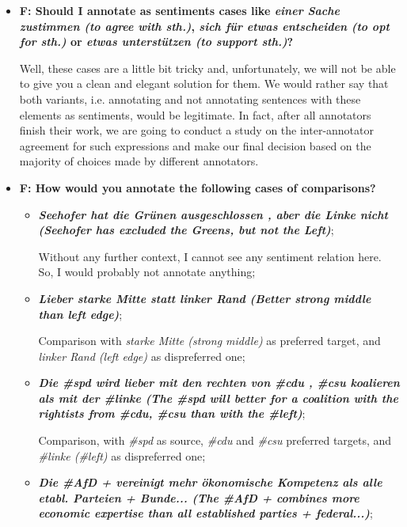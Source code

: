 \documentclass[11pt,a4paper]{article}
\begin{document}
\begin{itemize}
\item\textbf{F: Should I annotate as sentiments cases like \textit{einer Sache
    zustimmen (to agree with sth.)}, \textit{sich f\"ur etwas entscheiden (to
    opt for sth.)} or \textit{etwas unterst\"utzen (to support sth.)}?}

  Well, these cases are a little bit tricky and, unfortunately, we will not be
  able to give you a clean and elegant solution for them.  We would rather say
  that both variants, i.e. annotating and not annotating sentences with these
  elements as sentiments, would be legitimate.  In fact, after all annotators
  finish their work, we are going to conduct a study on the inter-annotator
  agreement for such expressions and make our final decision based on the
  majority of choices made by different annotators.

\item\textbf{F: How would you annotate the following cases of comparisons?}
  \begin{itemize}
  \item\textbf{\textit{Seehofer hat die Gr\"unen ausgeschlossen , aber die
      Linke nicht (Seehofer has excluded the Greens, but not the Left)}};

    Without any further context, I cannot see any sentiment relation here.
    So, I would probably not annotate anything;

  \item\textbf{\textit{Lieber starke Mitte statt linker Rand (Better strong
      middle than left edge)}};

    Comparison with \textit{starke Mitte (strong middle)} as preferred target,
    and \textit{linker Rand (left edge)} as dispreferred one;

  \item\textbf{\textit{Die \#spd wird lieber mit den rechten von \#cdu , \#csu
      koalieren als mit der \#linke (The \#spd will better for a coalition
      with the rightists from \#cdu, \#csu than with the \#left)}};

    Comparison, with \textit{\#spd} as source, \textit{\#cdu} and
    \textit{\#csu} preferred targets, and \textit{\#linke (\#left)} as
    dispreferred one;

  \item\textbf{\textit{Die \#AfD + vereinigt mehr \"okonomische Kompetenz als
      alle etabl. Parteien + Bunde... (The \#AfD + combines more economic
      expertise than all established parties + federal...)}};


\end{itemize}
\end{itemize}
\end{document}
